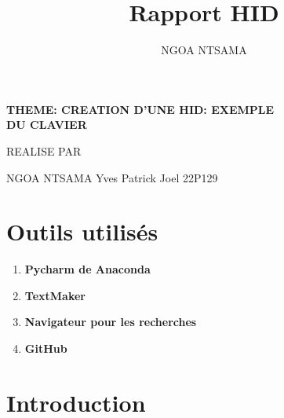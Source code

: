 \documentclass[12pt,a4paper]{report}
\author{NGOA NTSAMA }
\title{Rapport HID}
\begin{document}

\begin{center}

\begin{mybox}
\section*{}
   \bfseries  {\huge THEME: CREATION D'UNE HID: EXEMPLE \\ DU CLAVIER}
\\
\end{mybox}


  \vspace*{20cm}
  {\Large REALISE PAR}

  \vspace*{0.5cm}
  {\Large NGOA NTSAMA Yves Patrick Joel 22P129}

\end{center}



\newpage

\tableofcontents

\newpage

\section{Outils utilisés}
\begin{enumerate}
	\item {\bfseries Pycharm de Anaconda}
	\item {\bfseries TextMaker}
	\item {\bfseries Navigateur pour les recherches}
	\item {\bfseries GitHub }
\end{enumerate}
\newpage

\section{Introduction}
\end{document}
